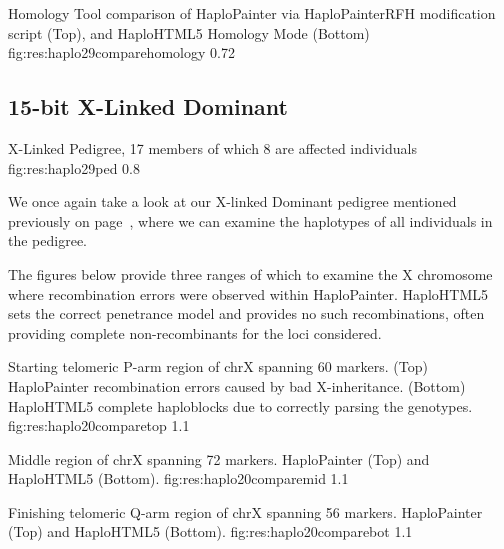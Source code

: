 	{Homology Tool comparison of HaploPainter via HaploPainterRFH modification script (Top), and HaploHTML5 Homology Mode (Bottom)}
	{fig:res:haplo29comparehomology}
	{0.72}

\subsection{15-bit X-Linked Dominant}

	{X-Linked Pedigree, 17 members of which 8 are affected individuals}
	{fig:res:haplo29ped}
	{0.8}

We once again take a look at our X-linked Dominant pedigree mentioned previously on page~\pageref{fig:res:15summary}, where we can examine the haplotypes of all individuals in the pedigree.

The figures below provide three ranges of which to examine the X chromosome where recombination errors were observed within HaploPainter. HaploHTML5 sets the correct penetrance model and provides no such recombinations, often providing complete non-recombinants for the loci considered.


	{Starting telomeric P-arm region of chrX spanning 60 markers. (Top) HaploPainter recombination errors caused by bad X-inheritance. (Bottom) HaploHTML5 complete haploblocks due to correctly parsing the genotypes.}
	{fig:res:haplo20comparetop}
	{1.1}


	{Middle region of chrX spanning 72 markers. HaploPainter (Top) and HaploHTML5 (Bottom).}
	{fig:res:haplo20comparemid}
	{1.1}


	{Finishing telomeric Q-arm region of chrX spanning 56 markers. HaploPainter (Top) and HaploHTML5 (Bottom).}
	{fig:res:haplo20comparebot}
	{1.1}



